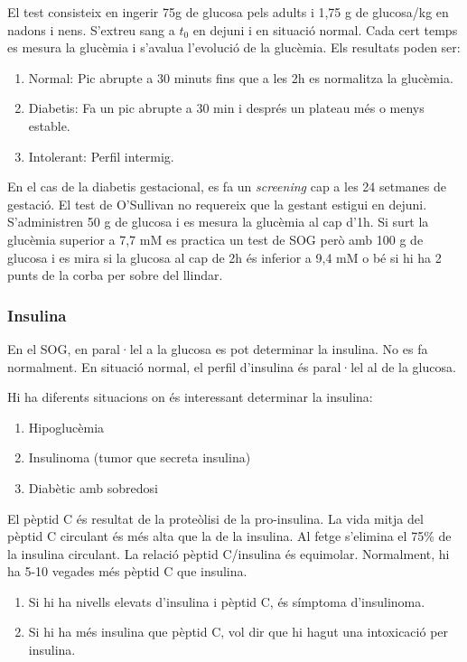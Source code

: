 El test consisteix en ingerir 75g de glucosa pels adults i 1,75 g de
glucosa/kg en nadons i nens. S'extreu sang a $t_0$ en dejuni i en
situació normal. Cada cert temps es mesura la glucèmia i s'avalua
l'evolució de la glucèmia. Els resultats poden ser:
\begin{enumerate}
\item Normal: Pic abrupte a 30 minuts fins que a les 2h es normalitza
  la glucèmia.
\item Diabetis: Fa un pic abrupte a 30 min i després un  plateau més o
  menys estable.
\item Intolerant: Perfil intermig.
\end{enumerate}

En el cas de la diabetis gestacional, es fa un \textit{screening} cap
a les 24 setmanes de gestació. El test de O'Sullivan no requereix que
la gestant estigui en dejuni. S'administren 50 g de glucosa i es
mesura la glucèmia al cap d'1h. Si surt la glucèmia superior a 7,7 mM
es practica un test de SOG però amb 100 g de glucosa i es mira si la
glucosa al cap de 2h és inferior a 9,4 mM o bé si hi ha 2 punts de la
corba per sobre del llindar.

\subsubsection{Insulina}
\label{sec:insulina}
En el SOG, en paral·lel a la glucosa es pot determinar la insulina. No
es fa normalment. En situació normal, el perfil d'insulina és
paral·lel al de la glucosa. 


Hi ha diferents situacions on és interessant determinar la insulina:
\begin{enumerate}
\item Hipoglucèmia
\item Insulinoma (tumor que secreta insulina)
\item Diabètic amb sobredosi
\end{enumerate}

El pèptid C és resultat de la proteòlisi de la pro-insulina. La vida
mitja del pèptid C circulant és més alta que la de la insulina. Al
fetge s'elimina el 75\% de la insulina circulant. La relació pèptid
C/insulina és equimolar. Normalment, hi ha 5-10 vegades més pèptid C
que insulina.
\begin{enumerate}
\item Si hi ha nivells elevats d'insulina i pèptid C, és símptoma
  d'insulinoma.
\item Si hi ha més insulina que pèptid C, vol dir que hi hagut una
  intoxicació per insulina.
\end{enumerate}

